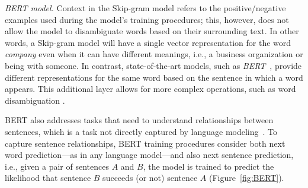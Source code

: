 \medskip
\begin{hangparas}{.0in}{0}
     \textit{BERT model.} Context in the Skip-gram model refers to the positive/negative examples used during the model's training procedures; this, however, does not allow the model to disambiguate words based on their surrounding text. In other words, a Skip-gram model will have a single vector representation for the word \textit{company} even when it can have different meanings, i.e., a business organization or being with someone. In contrast, state-of-the-art models, such as \textit{BERT}~\cite{Devlin2018Bert}, provide different representations for the same word based on the sentence in which a word appears.
    This additional layer allows for more complex operations, such as word disambiguation .
\end{hangparas}



BERT also addresses tasks that need to understand relationships between sentences, which is a task not directly captured by language modeling~\cite{Devlin2018Bert}. 
To capture sentence relationships, BERT training procedures consider both next word prediction---as in any language model---and also next sentence prediction, i.e., given a pair of sentences $A$ and $B$, the model 
is trained to predict the likelihood that sentence $B$ succeeds (or not) sentence $A$ (Figure~\ref{fig:BERT}). 







